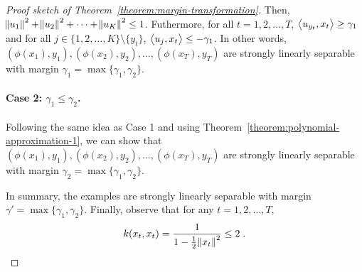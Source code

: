 \begin{proof}[Proof sketch of Theorem~\ref{theorem:margin-transformation}]
Then, $\norm{u_1}^2 + \norm{u_2}^2 + \dots + \norm{u_K}^2 \le 1$.
Futhermore, for all $t=1,2,\dots,T$, $\left\langle u_{y_t}, x_t \right\rangle \ge \gamma_1$
and for all $j \in \{1,2,\dots,K\} \setminus \{y_t\}$,
$\left\langle u_j, x_t \right\rangle \le - \gamma_1$. In other words,
$(\phi(x_1), y_1), (\phi(x_2), y_2), \dots, (\phi(x_T), y_T)$ are
strongly linearly separable with margin $\gamma_1 = \max\{\gamma_1, \gamma_2\}$.

\paragraph{Case 2: $\gamma_1 \leq \gamma_2$.} Following the
same idea as Case 1 and using Theorem~\ref{theorem:polynomial-approximation-1},
we can show that
$(\phi(x_1), y_1), (\phi(x_2), y_2), \dots, (\phi(x_T), y_T)$ are
strongly linearly separable with margin $\gamma_2 = \max\{\gamma_1, \gamma_2\}$.

In summary, the examples are strongly
linearly separable with margin $\gamma' = \max\{\gamma_1, \gamma_2\}$.
Finally, observe that for any $t=1,2,\dots,T$,
\[
k(x_t,x_t) = \frac{1}{1 - \frac{1}{2} \norm{x_t}^2} \le 2 \; .
\qedhere
\]
\end{proof}
